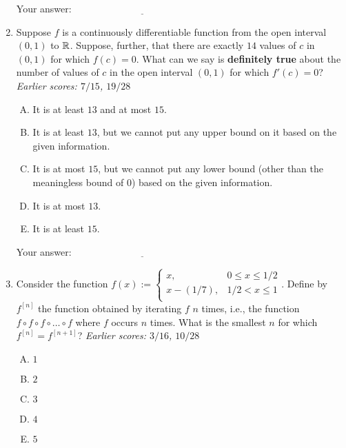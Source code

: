 \documentclass[10pt]{amsart}
\begin{document}
\begin{enumerate}
  \vspace{0.05in}
  Your answer: $\underline{\qquad\qquad\qquad\qquad\qquad\qquad\qquad}$
  \vspace{0.05in}

\item Suppose $f$ is a continuously differentiable function from the
  open interval $(0,1)$ to $\mathbb{R}$. Suppose, further, that there are
  exactly $14$ values of $c$ in $(0,1)$ for which $f(c) = 0$. What can
  we say is {\bf definitely true} about the number of values of $c$ in
  the open interval $(0,1)$ for which $f'(c) = 0$? {\em Earlier scores:
  $7/15$, $19/28$}

  \begin{enumerate}[(A)]
  \item It is at least $13$ and at most $15$.
  \item It is at least $13$, but we cannot put any upper bound on it
    based on the given information.
  \item It is at most $15$, but we cannot put any lower bound (other
  than the meaningless bound of $0$) based on the given information.
  \item It is at most $13$.
  \item It is at least $15$.
  \end{enumerate}

  \vspace{0.05in}
  Your answer: $\underline{\qquad\qquad\qquad\qquad\qquad\qquad\qquad}$
  \vspace{0.05in}
  
\item Consider the function $f(x) := \left \lbrace\begin{array}{rl} x, & 0
  \le x \le 1/2 \\ x - (1/7), & 1/2 < x \le 1 \\\end{array} \right.$. Define by
  $f^{[n]}$ the function obtained by iterating $f$ $n$ times, i.e.,
  the function $f \circ f \circ f \circ \dots \circ f$ where $f$
  occurs $n$ times. What is the smallest $n$ for which $f^{[n]} =
  f^{[n + 1]}$? {\em Earlier scores: $3/16$, $10/28$}

  \begin{enumerate}[(A)]
  \item $1$
  \item $2$
  \item $3$
  \item $4$
  \item $5$
  \end{enumerate}


\end{enumerate}
\end{document}
